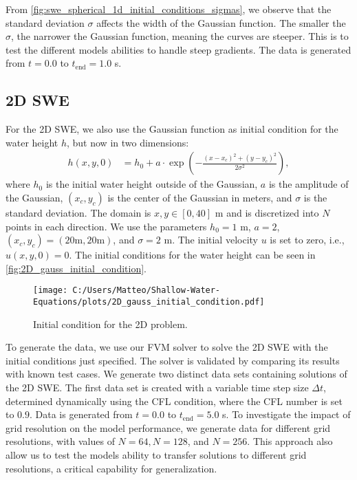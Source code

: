 From \autoref{fig:swe_spherical_1d_initial_conditions_sigmas}, we observe that the standard deviation \(\sigma\) affects the width of the Gaussian function.
The smaller the $\sigma$, the narrower the Gaussian function, meaning the curves are steeper.
This is to test the different models abilities to handle steep gradients.
The data is generated from $t = 0.0$ to $t_{\text{end}} = 1.0$ s.

\subsection*{2D SWE}
For the 2D SWE, we also use the Gaussian function as initial condition for the water height $h$, but now in two dimensions:
\begin{align}\label{eq:2D_swe_ic_gaussian}
    h(x,y,0) &= h_0 + a \cdot \exp \left( -\frac{{(x-x_c)}^2 + {(y-y_c)}^2}{2\sigma^2} \right), 
\end{align}
where $h_0$ is the initial water height outside of the Gaussian, $a$ is the amplitude of the Gaussian, $(x_c, y_c)$ is the center of the Gaussian in meters, and $\sigma$ is the standard deviation.
The domain is $x,y \in [0,40]$ m and is discretized into $N$ points in each direction.
We use the parameters $h_0 = 1$ m, $a = 2$, $(x_c, y_c) = (20 \text{m}, 20 \text{m})$, and $\sigma = 2$ m.
The initial velocity $u$ is set to zero, i.e., $u(x,y,0) = 0$.
The initial conditions for the water height can be seen in \autoref{fig:2D_gauss_initial_condition}.
\begin{figure}[H]
    \centering
    \texttt{[image: C:/Users/Matteo/Shallow-Water-Equations/plots/2D\_gauss\_initial\_condition.pdf]}
    \caption{Initial condition for the 2D problem.}\label{fig:2D_gauss_initial_condition_data_gen}
\end{figure}
To generate the data, we use our FVM solver to solve the 2D SWE with the initial conditions just specified.
The solver is validated by comparing its results with known test cases.
We generate two distinct data sets containing solutions of the 2D SWE.
The first data set is created with a variable time step size $\Delta t$, determined dynamically using the CFL condition, where the CFL number is set to $0.9$.
Data is generated from $t = 0.0$ to $t_{\text{end}} = 5.0$ s.
To investigate the impact of grid resolution on the model performance, we generate data for different grid resolutions, with values of $N = 64, N = 128$, and $N = 256$.
This approach also allow us to test the models ability to transfer solutions to different grid resolutions, a critical capability for generalization.

